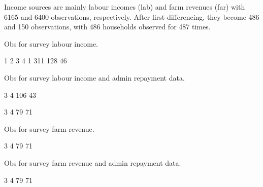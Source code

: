 Income sources are mainly labour incomes (\textsf{lab}) and farm revenues (\textsf{far}) with 6165 and 6400 observations, respectively. After first-differencing, they become 486 and 150 observations, with 486 households observed for 487 times. 


Obs for survey labour income.
\begin{Schunk}
\begin{Soutput}

  1   2   3   4 
  1 311 128  46 
\end{Soutput}
\end{Schunk}
Obs for survey labour income and admin repayment data.
\begin{Schunk}
\begin{Soutput}

  3   4 
106  43 
\end{Soutput}
\begin{Soutput}

 3  4 
79 71 
\end{Soutput}
\end{Schunk}
Obs for survey farm revenue.
\begin{Schunk}
\begin{Soutput}

 3  4 
79 71 
\end{Soutput}
\end{Schunk}
Obs for survey farm revenue and admin repayment data.
\begin{Schunk}
\begin{Soutput}

 3  4 
79 71 
\end{Soutput}
\end{Schunk}







